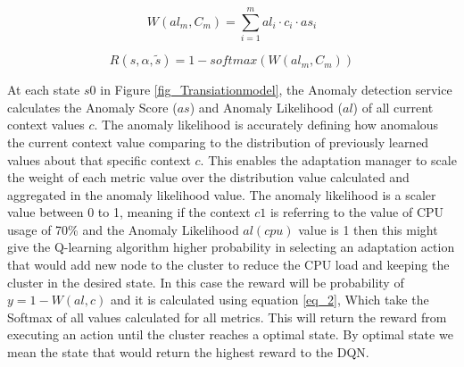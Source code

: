 \documentclass{ieeeaccess}
\begin{document}
\begin{equation}
\label{eq_1}
W(al_{m},C_{m}) =  \sum_{i=1}^{m} al_{i} \cdot  c_{i} \cdot as_{i}
\end{equation}

 \begin{equation}
\label{eq_2}
R(s, \alpha, \tilde{s}) =  1 -  softmax(W(al_{m},C_{m}))
\end{equation}

At each state $s0$ in Figure \ref{fig_Transiationmodel}, the Anomaly detection service calculates the Anomaly Score ($as$) and Anomaly Likelihood ($al$) of all current context values $c$. The anomaly likelihood is accurately defining how anomalous the current context value comparing to the distribution of previously learned values about that specific context $c$. This enables the adaptation manager to scale the weight of each metric value over the distribution value calculated and aggregated in the anomaly likelihood value. The anomaly likelihood is a scaler value between 0 to 1, meaning if the context  $c1$ is referring to the value of CPU usage of 70\% and the Anomaly Likelihood $al(cpu)$ value is 1 then this might give the Q-learning algorithm higher probability in selecting an adaptation action that would add new node to the cluster to reduce the CPU load and keeping the cluster in the desired state. In this case the reward will be probability of $y = 1 - W(al, c)$ and it is calculated using equation \ref{eq_2}, Which take the Softmax of all values calculated for all metrics. This will return the reward from executing an action until the cluster reaches a optimal state. By optimal state we mean the state that would return the highest reward to the DQN. 
\end{document}
